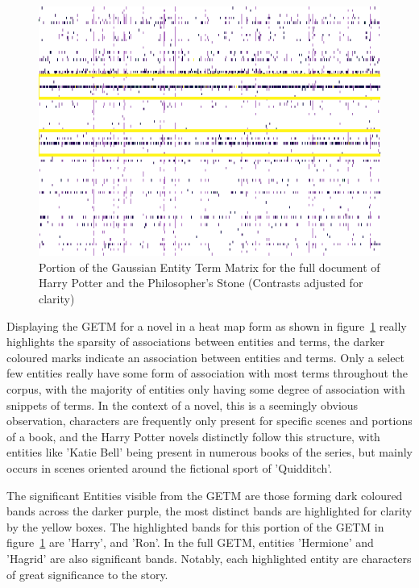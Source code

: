 \documentclass[10pt]{report}
\begin{document}
\begin{figure}[h!]
  \centering
  \includegraphics[scale=0.7]{phil_stone_getm_snippet_invert}
  \caption{Portion of the Gaussian Entity Term Matrix for the full document of Harry Potter and the Philosopher's Stone (Contrasts adjusted for clarity)\label{fig:hp_full_ps_getm}} 
\end{figure}

Displaying the GETM for a novel in a heat map form as shown in figure~\ref{fig:hp_full_ps_getm} really highlights the sparsity of associations between entities and terms, the darker coloured marks indicate an association between entities and terms. Only a select few entities really have some form of association with most terms throughout the corpus, with the majority of entities only having some degree of association with snippets of terms. In the context of a novel, this is a seemingly obvious observation, characters are frequently only present for specific scenes and portions of a book, and the Harry Potter novels distinctly follow this structure, with entities like 'Katie Bell' being present in numerous books of the series, but mainly occurs in scenes oriented around the fictional sport of 'Quidditch'.

The significant Entities visible from the GETM are those forming dark coloured bands across the darker purple, the most distinct bands are highlighted for clarity by the yellow boxes. The highlighted bands for this portion of the GETM in figure~\ref{fig:hp_full_ps_getm} are 'Harry', and 'Ron'. In the full GETM, entities 'Hermione' and 'Hagrid' are also significant bands. Notably, each highlighted entity are characters of great significance to the story.
\end{document}
